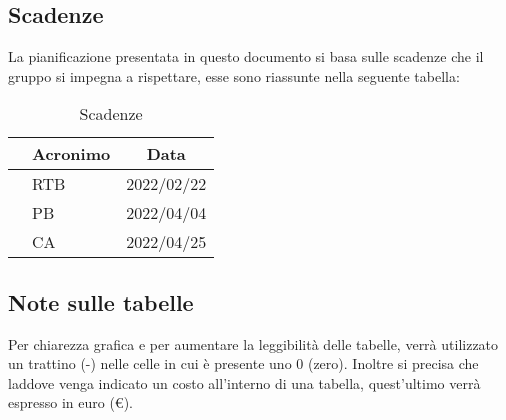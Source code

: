 \subsection{Scadenze} \label{subsection:intro_scadenze}
La pianificazione presentata in questo documento si basa sulle scadenze che il gruppo \groupName{} si impegna a rispettare, esse sono riassunte nella seguente tabella:
\begin{table}[H]
  \centering
  \renewcommand{\arraystretch}{1.8}
  \begin{tabular}{p{7cm}|p{2cm}|p{2cm}}
    \rowcolor[HTML]{125E28} 
    \multicolumn{1}{c}{\color[HTML]{FFFFFF}\textbf{Revisione}}
    & \multicolumn{1}{c}{\color[HTML]{FFFFFF}\textbf{Acronimo}}
    & \multicolumn{1}{c}{\color[HTML]{FFFFFF}\textbf{Data}}\\
    \hline
    \RTB{} & RTB & 2022/02/22 \\
    \PB{} & PB & 2022/04/04 \\
    \CA{} & CA & 2022/04/25 \\
  \end{tabular}
  \caption{Scadenze}
\end{table}

\subsection{Note sulle tabelle} \label{subsection:intro_note_tabelle}
Per chiarezza grafica e per aumentare la leggibilità delle tabelle, verrà utilizzato un trattino (-) nelle celle in cui è presente uno 0 (zero).
Inoltre si precisa che laddove venga indicato un costo all'interno di una tabella, quest'ultimo verrà espresso in euro (€).